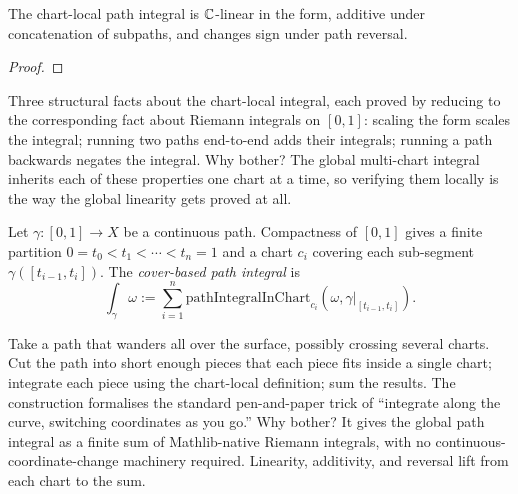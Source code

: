 \begin{lemma}
\label{lem:path-integral-in-chart-linearity}
The chart-local path integral is \(\mathbb{C}\)-linear in the form, additive
under concatenation of subpaths, and changes sign under path
reversal.
\leanok
\end{lemma}
\begin{proof}\leanok\end{proof}

\begin{layman}
Three structural facts about the chart-local integral, each proved
by reducing to the corresponding fact about Riemann integrals on
\([0,1]\): scaling the form scales the integral; running two paths
end-to-end adds their integrals; running a path backwards negates
the integral. Why bother? The global multi-chart integral inherits
each of these properties one chart at a time, so verifying them
locally is the way the global linearity gets proved at all.
\end{layman}

\begin{definition}
\label{def:path-integral-via-cover}
Let \(\gamma:[0,1]\to X\) be a continuous path. Compactness of
\([0,1]\) gives a finite partition
\(0=t_0<t_1<\cdots<t_n=1\) and a chart \(c_i\) covering each
sub-segment \(\gamma([t_{i-1},t_i])\). The \emph{cover-based path
integral} is
\[
  \int_\gamma \omega
    := \sum_{i=1}^{n}
       \mathrm{pathIntegralInChart}_{c_i}(\omega,\gamma|_{[t_{i-1},t_i]}).
\]
\leanok
\end{definition}

\begin{layman}
Take a path that wanders all over the surface, possibly crossing
several charts. Cut the path into short enough pieces that each
piece fits inside a single chart; integrate each piece using the
chart-local definition; sum the results. The construction
formalises the standard pen-and-paper trick of ``integrate along
the curve, switching coordinates as you go.'' Why bother? It gives
the global path integral as a finite sum of Mathlib-native
Riemann integrals, with no continuous-coordinate-change machinery
required. Linearity, additivity, and reversal lift from each chart
to the sum.
\end{layman}

